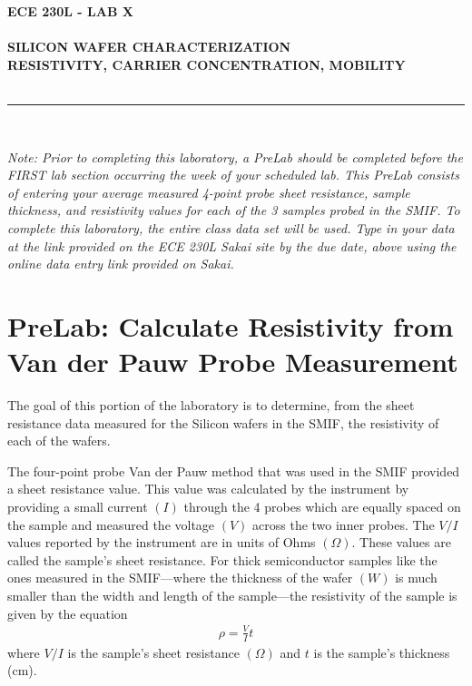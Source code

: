 \documentclass[12pt]{../manual}
\begin{document}
\begin{center}
\textbf{\huge ECE 230L - LAB X}\\~\\
\textbf{\large SILICON WAFER CHARACTERIZATION \\
RESISTIVITY, CARRIER CONCENTRATION, MOBILITY}\\~\\
\rule{6.5in}{0.5mm}\\
\end{center}

\textit{Note: Prior to completing this laboratory, a PreLab should be completed before the FIRST lab section occurring the week of your scheduled lab.  This PreLab consists of entering your average measured 4-point probe sheet resistance, sample thickness, and resistivity values for each of the 3 samples probed in the SMIF.  To complete this laboratory, the entire class data set will be used.  Type in your data at the link provided on the ECE 230L Sakai site by the due date, above using the online data entry link provided on Sakai.}

\tableofcontents

\newpage
%
\section*{PreLab: Calculate Resistivity from Van der Pauw Probe Measurement}

The goal of this portion of the laboratory is to determine, from the sheet resistance data measured for the Silicon wafers in the SMIF, the resistivity of each of the wafers.

The four-point probe Van der Pauw method that was used in the SMIF provided a sheet resistance value.  This value was calculated by the instrument by providing a small current $(I)$ through the 4 probes which are equally spaced on the sample and measured the voltage $(V)$ across the two inner probes.  The $V/I$ values reported by the instrument are in units of Ohms $(\Omega)$.  These values are called the sample's sheet resistance.  For thick semiconductor samples like the ones measured in the SMIF---where the thickness of the wafer $(W)$ is much smaller than the width and length of the sample---the resistivity of the sample is given by the equation
\begin{align}
\rho = \frac{V}{I} t
\end{align}
where $V/I$ is the sample's sheet resistance $(\Omega)$ and $t$ is the sample's thickness (cm).
\end{document}
